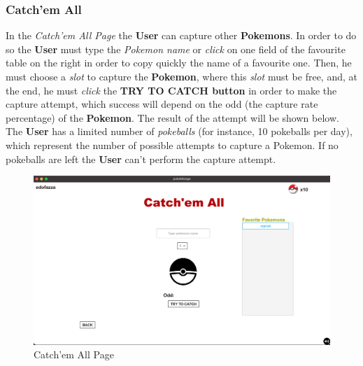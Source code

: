 \subsubsection{Catch'em All}
In the \textit{Catch'em All Page} the \textbf{User} can capture other \textbf{Pokemons}. In order to do so the \textbf{User} must type the \textit{Pokemon name} or \textit{click} on one field of the favourite table on the right in order to copy quickly the name of a favourite one. Then, he must choose a \textit{slot} to capture the \textbf{Pokemon}, where this \textit{slot} must be free, and, at the end, he must \textit{click} the \textbf{TRY TO CATCH button} in order to make the capture attempt, which success will depend on the odd (the capture rate percentage) of the \textbf{Pokemon}. The result of the attempt will be shown below. The \textbf{User} has a limited number of \textit{pokeballs} (for instance, 10 pokeballs per day), which represent the number of possible attempts to capture a Pokemon. If no pokeballs are left the \textbf{User} can't perform the capture attempt.
\begin{figure}[H]
	\centering
	\includegraphics[width=\textwidth]{img/userManual/catch.png}
	\caption{Catch'em All Page}
\end{figure}
